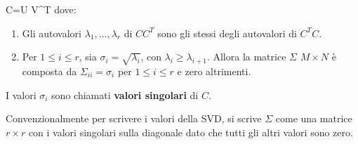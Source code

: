 \documentclass[\main/main.tex]{subfiles}
\begin{document}
\begin{multicols}{2}
\begin{definition}
        C=U \Sigma V^{T}
    \) dove:
    \begin{enumerate}
        \item Gli autovalori \(\lambda_1, \ldots, \lambda_r\) di \(CC^T\) sono gli stessi degli autovalori di \(C^T C\).
        \item Per \(1 \leq i \leq r\), sia \(\sigma_i = \sqrt{\lambda_i}\), con \(\lambda_i \geq \lambda_{i+1}\). Allora la matrice \(\Sigma\) \(M \times N\) è composta da \(\Sigma_{ii} = \sigma_i\) per \(1\leq i \leq r\) e zero altrimenti.
    \end{enumerate}
    I valori \(\sigma_i\) sono chiamati \textbf{valori singolari} di \(C\).
\end{definition}
\begin{definition}
    Convenzionalmente per scrivere i valori della SVD, si scrive \(\Sigma\) come una matrice \(r \times r\) con i valori singolari sulla diagonale dato che tutti gli altri valori sono zero.
    

\end{definition}
\end{multicols}
\end{document}
